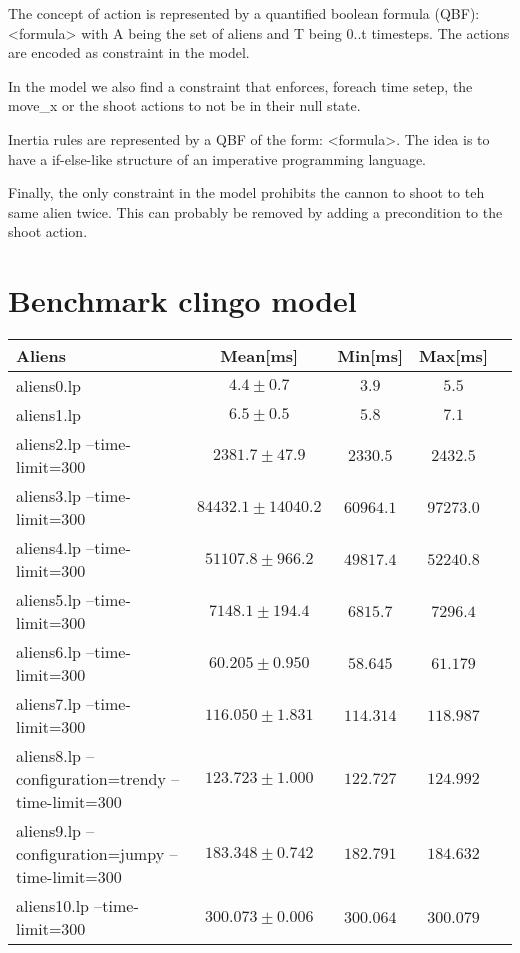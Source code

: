 \documentclass[11pt]{article}
\begin{document}
The concept of action is represented by a quantified boolean formula (QBF): <formula> with A being the set of aliens and T being 0..t timesteps. The actions are encoded as constraint in the model.

In the model we also find a constraint that enforces, foreach time setep, the move\_x or the shoot actions to not be in their null state.

Inertia rules are represented by a QBF of the form: <formula>. The idea is to have a if-else-like structure of an imperative programming language.

Finally, the only constraint in the model prohibits the cannon to shoot to teh same alien twice. This can probably be removed by adding a precondition to the shoot action.

\section{Benchmark clingo model}

  \begin{tabular}{ |l|c|c|c|c| }
    \hline
    Aliens & Mean[ms] & Min[ms] & Max[ms] \\
    \hline
    aliens0.lp & $4.4 \pm 0.7$ & $3.9$ & $5.5$ \\
    aliens1.lp & $6.5 \pm 0.5$ & $5.8$ & $7.1$ \\
    aliens2.lp --time-limit=300 & $2381.7 \pm 47.9$ & $2330.5$ & $2432.5$ \\
    aliens3.lp --time-limit=300 & $84432.1 \pm 14040.2$ & $60964.1$ & $97273.0$ \\
    aliens4.lp --time-limit=300 & $51107.8 \pm 966.2$ & $49817.4$ & $52240.8$ \\
    aliens5.lp --time-limit=300 & $7148.1 \pm 194.4$ & $6815.7$ & $7296.4$ \\
    aliens6.lp --time-limit=300 & $60.205 \pm 0.950$ & $58.645$ & $61.179$ \\
    aliens7.lp --time-limit=300 & $116.050 \pm 1.831$ & $114.314$ & $118.987$ \\
    aliens8.lp --configuration=trendy --time-limit=300 & $123.723 \pm 1.000$ & $122.727$ & $124.992$ \\
    aliens9.lp --configuration=jumpy --time-limit=300 & $183.348 \pm 0.742$ & $182.791$ & $184.632$ \\
    aliens10.lp --time-limit=300 & $300.073 \pm 0.006$ & $300.064$ & $300.079$ \\
    \hline
  \end{tabular}
\end{document}
